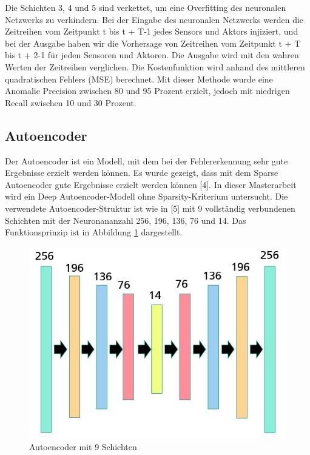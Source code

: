 \documentclass[12pt,a4paper]{scrartcl}
\numberwithin{equation}{section}
\begin{document}
Die Schichten 3, 4 und 5 sind verkettet, um eine Overfitting des neuronalen Netzwerks zu verhindern.
Bei der Eingabe des neuronalen Netzwerks werden die Zeitreihen vom Zeitpunkt t bis t + T-1 jedes Sensors und Aktors injiziert, und bei der Ausgabe haben wir die Vorhersage von Zeitreihen vom Zeitpunkt t + T bis t + 2-1 für jeden Sensoren und Aktoren. Die Ausgabe wird mit den wahren Werten der Zeitreihen verglichen. Die Kostenfunktion wird anhand des mittleren quadratischen Fehlers (MSE) berechnet. Mit dieser Methode wurde eine Anomalie Precision zwischen 80 und 95 Prozent erzielt, jedoch mit niedrigen Recall zwischen 10 und 30 Prozent. 

\subsection{Autoencoder}

Der Autoencoder ist ein Modell, mit dem bei der Fehlererkennung sehr gute Ergebnisse erzielt werden können. Es wurde gezeigt, dass mit dem Sparse Autoencoder gute Ergebnisse erzielt werden können [4]. In dieser Masterarbeit wird ein Deep Autoencoder-Modell ohne Sparsity-Kriterium untersucht. Die verwendete Autoencoder-Struktur ist wie in [5] mit 9 vollständig verbundenen Schichten mit der Neuronananzahl 256, 196, 136, 76 und 14. Das Funktionsprinzip ist in Abbildung \ref{auto} dargestellt.


\begin{figure}[h]
	\centering
	  \includegraphics[scale=0.5]{autoencoder.jpg}
	  \caption{Autoencoder mit 9 Schichten}
	\label{auto}
\end{figure}
\end{document}
